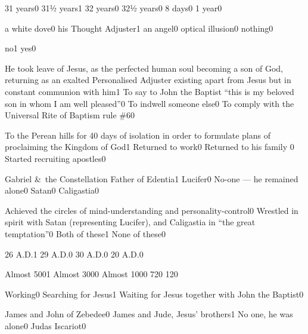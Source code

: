 {31 years}{0}
{31½ years}{1}
{32 years}{0}
{32½ years}{0}
{8 days}{0}
{1 year}{0}
\qstop

{a white dove}{0}
{his Thought Adjuster}{1}
{an angel}{0}
{optical illusion}{0}
{nothing}{0}
\qstop

{no}{1}
{yes}{0}
\qstop

{He took leave of Jesus, as the perfected human soul becoming a son of God, returning as an exalted Personalised Adjuster existing apart from Jesus but in constant communion with him}{1}
{To say to John the Baptist ``this is my beloved son in whom I am well pleased''}{0}
{To indwell someone else}{0}
{To comply with the Universal Rite of Baptism rule \#6}{0}
\qstop

{To the Perean hills for 40 days of isolation in order to formulate plans of proclaiming the Kingdom of God}{1}
{Returned to work}{0}
{Returned to his family }{0}
{Started recruiting apostles}{0}
\qstop

{Gabriel \&\ the Constellation Father of Edentia}{1}
{Lucifer}{0}
{No-one --- he remained alone}{0}
{Satan}{0}
{Caligastia}{0}
\qstop

{Achieved the circles of mind-understanding and personality-control}{0}
{Wrestled in spirit with Satan (representing Lucifer), and Caligastia in ``the great temptation''}{0}
{Both of these}{1}
{None of these}{0}
\qstop

{26 A.D.}{1}
{29 A.D.}{0}
{30 A.D.}{0}
{20 A.D.}{0}
\qstop

{Almost 500}{1}
{Almost 300}{0}
{Almost 100}{0}
{72}{0}
{12}{0}
\qstop

{Working}{0}
{Searching for Jesus}{1}
{Waiting for Jesus together with John the Baptist}{0}
\qstop

{James and John of Zebedee}{0}
{James and Jude, Jesus' brothers}{1}
{No one, he was alone}{0}
{Judas Iscariot}{0}
\qstop

